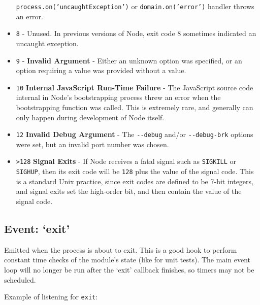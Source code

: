 \begin{itemize}
  \texttt{process.on('uncaughtException')} or
  \texttt{domain.on('error')} handler throws an error.
\item
  \texttt{8} - Unused. In previous versions of Node, exit code 8
  sometimes indicated an uncaught exception.
\item
  \texttt{9} - \textbf{Invalid Argument} - Either an unknown option was
  specified, or an option requiring a value was provided without a
  value.
\item
  \texttt{10} \textbf{Internal JavaScript Run-Time Failure} - The
  JavaScript source code internal in Node's bootstrapping process threw
  an error when the bootstrapping function was called. This is extremely
  rare, and generally can only happen during development of Node itself.
\item
  \texttt{12} \textbf{Invalid Debug Argument} - The \texttt{-{}-debug}
  and/or \texttt{-{}-debug-brk} options were set, but an invalid port
  number was chosen.
\item
  \texttt{\textgreater{}128} \textbf{Signal Exits} - If Node receives a
  fatal signal such as \texttt{SIGKILL} or \texttt{SIGHUP}, then its
  exit code will be \texttt{128} plus the value of the signal code. This
  is a standard Unix practice, since exit codes are defined to be 7-bit
  integers, and signal exits set the high-order bit, and then contain
  the value of the signal code.
\end{itemize}

\subsection{Event: `exit'}

Emitted when the process is about to exit. This is a good hook to
perform constant time checks of the module's state (like for unit
tests). The main event loop will no longer be run after the `exit'
callback finishes, so timers may not be scheduled.

Example of listening for \texttt{exit}:

\begin{Shaded}
\begin{Highlighting}[]
\NormalTok{(}\NormalTok{, }\NormalTok{() \{}
  \NormalTok{() \{}
    \NormalTok{(}\NormalTok{);}
  \NormalTok{\}, }\NormalTok{);}
  \NormalTok{(}\NormalTok{);}
\NormalTok{\});}
\end{Highlighting}
\end{Shaded}

